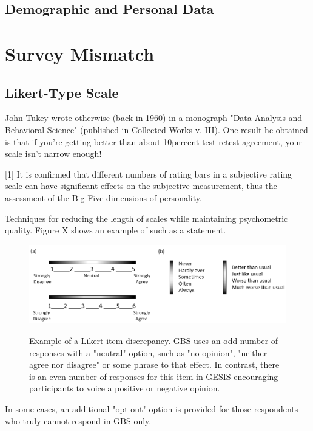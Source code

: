 \subsection{Demographic and Personal Data}


\section{Survey Mismatch}

\subsection{Likert-Type Scale}

John Tukey wrote otherwise (back in 1960) in a monograph "Data Analysis and Behavioral Science" (published in Collected Works v. III). One result he obtained is that if you're getting better than about 10percent test-retest agreement, your scale isn't narrow enough!

[1] It is confirmed that different numbers of rating bars in a subjective rating scale can have significant effects on the subjective measurement, thus the assessment of the Big Five dimensions of personality.

Techniques for reducing the length of scales while maintaining psychometric quality.
Figure X shows an example of such as a statement.

\begin{figure}[ht]
	\begin{center}
		\includegraphics[scale=0.55,angle=0]{fig/scales}
		\label{6_5}
		\caption{Example of a Likert item discrepancy. GBS uses an odd number of responses with a "neutral" option, such as "no opinion", "neither agree nor disagree" or some phrase to that effect. In contrast, there is an even number of responses for this item in GESIS encouraging participants to voice a positive or negative opinion.}
	\end{center}
\end{figure}

In some cases, an additional "opt-out" option is provided for those respondents who truly cannot respond in GBS only.

